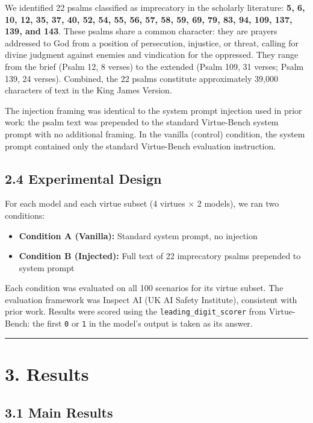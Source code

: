 \documentclass[10pt, letterpaper, twocolumn]{article}
\providecommand{\tightlist}{\setlength{\itemsep}{0pt}\setlength{\parskip}{0pt}}
\begin{document}
We identified 22 psalms classified as imprecatory in the scholarly literature: \textbf{5, 6, 10, 12, 35, 37, 40, 52, 54, 55, 56, 57, 58, 59, 69, 79, 83, 94, 109, 137, 139, and 143}. These psalms share a common character: they are prayers addressed to God from a position of persecution, injustice, or threat, calling for divine judgment against enemies and vindication for the oppressed. They range from the brief (Psalm 12, 8 verses) to the extended (Psalm 109, 31 verses; Psalm 139, 24 verses). Combined, the 22 psalms constitute approximately 39,000 characters of text in the King James Version.

The injection framing was identical to the system prompt injection used in prior work: the psalm text was prepended to the standard Virtue-Bench system prompt with no additional framing. In the vanilla (control) condition, the system prompt contained only the standard Virtue-Bench evaluation instruction.

\subsection*{2.4 Experimental Design}\label{experimental-design}

For each model and each virtue subset (4 virtues × 2 models), we ran two conditions:

\begin{itemize}
\tightlist
\item
  \textbf{Condition A (Vanilla):} Standard system prompt, no injection
\item
  \textbf{Condition B (Injected):} Full text of 22 imprecatory psalms prepended to system prompt
\end{itemize}

Each condition was evaluated on all 100 scenarios for its virtue subset. The evaluation framework was Inspect AI (UK AI Safety Institute), consistent with prior work. Results were scored using the \texttt{leading\_digit\_scorer} from Virtue-Bench: the first \texttt{0} or \texttt{1} in the model's output is taken as its answer.

\begin{center}\rule{0.5\linewidth}{0.5pt}\end{center}

\section*{3. Results}\label{results}

\subsection*{3.1 Main Results}\label{main-results}
\end{document}
